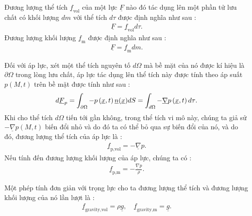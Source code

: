 \documentclass[CO_LUU_CHAT.tex]{subfiles}
\begin{document}
		Đương lượng thể tích $\underline{f}_{\text{vol}}$ của một lực $\underline{F}$ nào đó tác dụng lên một phần tử lưu chất có khối lượng $dm$ với thể tích $d\tau$ được định nghĩa như sau :
			\begin{equation}
				\begin{aligned}
					\underline{F}=\underline{f}_{\text{vol}}d\tau.
				\end{aligned}
			\end{equation}
		Đương lượng khối lượng $\underline{f}_{\text{m}}$ được định nghĩa như sau :
			\begin{equation}
				\begin{aligned}
					\underline{F}=\underline{f}_{\text{m}}dm.
				\end{aligned}
			\end{equation}

		Đối với áp lực, xét một thể tích nguyên tố $d\Omega$ mà bề mặt của nó được kí hiệu là $\partial\Omega$ trong lòng lưu chất, áp lực tác dụng lên thể tích này được tính theo áp suất $p(M,t)$ trên bề mặt được tính như sau :
			\[
				d\underline F_p  = \int_{\partial \Omega } { - p\left( {\underline{x},t} \right)\underline n(\underline{x}) dS}  = \int_{d\Omega } { - \underline \nabla  p\left( {\underline{x},t} \right)d\tau }.
			\]
		Khi cho thể tích $d\Omega$ tiến tới gần không, trong thể tích vi mô này, chúng ta giả sử $-\underline\nabla p\left(M,t\right)$ biến đổi nhỏ và do đó ta có thể bỏ qua sự biến đổi của nó, và do đó, đương lượng thể tích của áp lực là :
			\begin{equation}
				\begin{aligned}
					\boxed{
						\underline{f}_{\text{p,vol}}=-\underline\nabla p.
					}
				\end{aligned}
			\end{equation}
		Nếu tính đến đương lượng khối lượng của áp lực, chúng ta có :
			\begin{equation}
				\begin{aligned}
					\boxed{
						\underline{f}_{\text{p,m}}=-\frac{\underline\nabla p}{\rho}.
					}
				\end{aligned}
			\end{equation}

		Một phép tính đơn giản với trọng lực cho ta đương lượng thể tích và đương lượng khối lượng của nó lần lượt là :
			\begin{equation}
				\begin{aligned}
					\underline{f}_{\text{gravity,vol}}=\rho\underline{g},\quad\underline{f}_{\text{gravity,m}}=\underline{g}.
				\end{aligned}
			\end{equation}
\end{document}
